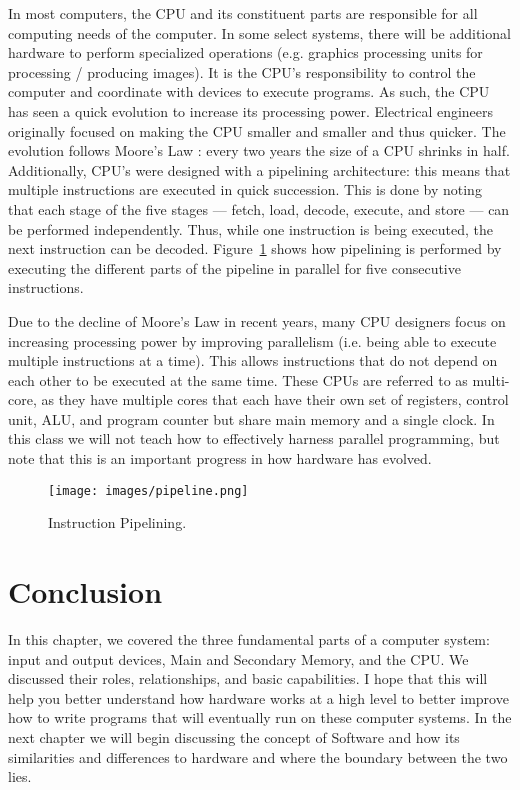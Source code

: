 In most computers, the CPU and its constituent parts are responsible for all
computing needs of the computer. In some select systems, there will be additional
hardware to perform specialized operations (e.g. graphics processing units for
processing / producing images). It is the CPU's responsibility to control the
computer and coordinate with devices to execute programs. As such, the CPU
has seen a quick evolution to increase its processing power. Electrical
engineers originally focused on making the CPU smaller and smaller and thus
quicker. The evolution follows Moore's Law : every two years the size of a CPU shrinks
in half. Additionally, CPU's were designed with a pipelining architecture: this means
that multiple instructions are executed in quick succession. This is done
by noting that each stage of the five stages --- fetch, load,  decode, execute,
and store --- can be performed independently. Thus, while one instruction is
being executed, the next instruction can be decoded. Figure~\ref{fig:hardware:pipeline}
shows how pipelining is performed by executing the different parts of the pipeline
in parallel for five consecutive instructions.

Due to the decline of Moore's Law in recent years, many CPU designers focus on
increasing processing power by improving parallelism (i.e. being able to execute
multiple instructions at a time). This allows instructions that do not depend
on each other to be executed at the same time. These CPUs are referred to as multi-core,
as they have multiple cores that each have their own set of registers, control unit,
ALU, and program counter but share main memory and a single clock. In this class we will not
teach how to effectively harness parallel programming, but note that this is
an important progress in how hardware has evolved.

\begin{figure}
	\centering
	\texttt{[image: images/pipeline.png]}
	\caption{Instruction Pipelining. }
	\label{fig:hardware:pipeline}
\end{figure}


\section {Conclusion}
In this chapter, we covered the three fundamental parts of a computer system:
input and output devices, Main and Secondary Memory, and the CPU. We discussed
their roles, relationships, and basic capabilities. I hope that this will help
you better understand how hardware works at a high level to better improve how
to write programs that will eventually run on these computer systems. In the
next chapter we will begin discussing the concept of Software and how its
similarities and differences to hardware and where the boundary between the two
lies.


